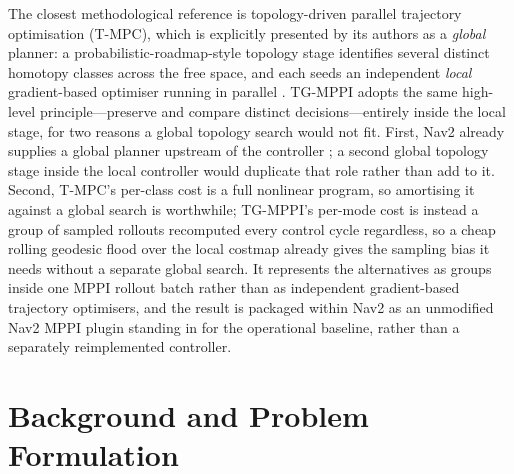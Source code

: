 \documentclass[journal]{IEEEtran}
\begin{document}
The closest methodological reference is topology-driven parallel trajectory
optimisation (T-MPC), which is explicitly presented by its authors as a
\emph{global} planner: a probabilistic-roadmap-style topology stage identifies
several distinct homotopy classes across the free space, and each seeds an
independent \emph{local} gradient-based optimiser running in parallel
\cite{degroot2025tmpc}. TG-MPPI adopts the same high-level
principle---preserve and compare distinct decisions---entirely inside the
local stage, for two reasons a global topology search would not fit. First,
Nav2 already supplies a global planner upstream of the controller
\cite{macenski2023nav2}; a second global topology stage inside the local
controller would duplicate that role rather than add to it. Second, T-MPC's
per-class cost is a full nonlinear program, so amortising it against a
global search is worthwhile; TG-MPPI's per-mode cost is instead a group of
sampled rollouts recomputed every control cycle regardless, so a cheap
rolling geodesic flood over the local costmap already gives the sampling
bias it needs without a separate global search. It represents the
alternatives as groups inside one MPPI rollout batch rather than as
independent gradient-based trajectory optimisers, and the result is packaged
within Nav2 as an unmodified Nav2 MPPI plugin standing in for the
operational baseline, rather than a separately reimplemented controller.

\section{Background and Problem Formulation}
\label{sec:problem}
\end{document}
